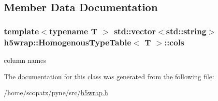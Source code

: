 \subsection{Member Data Documentation}
\hypertarget{classh5wrap_1_1_homogenous_type_table_a8b60fa54475f44bea26caab0137d8507}{
\subsubsection[{cols}]{\setlength{\rightskip}{0pt plus 5cm}template$<$typename T $>$ std\-::vector$<$std\-::string$>$ {\bf h5wrap\-::\-Homogenous\-Type\-Table}$<$ T $>$\-::cols}}\label{classh5wrap_1_1_homogenous_type_table_a8b60fa54475f44bea26caab0137d8507}
column names 

The documentation for this class was generated from the following file\-:\begin{DoxyCompactItemize}
\item 
/home/scopatz/pyne/src/\hyperlink{h5wrap_8h}{h5wrap.\-h}\end{DoxyCompactItemize}
